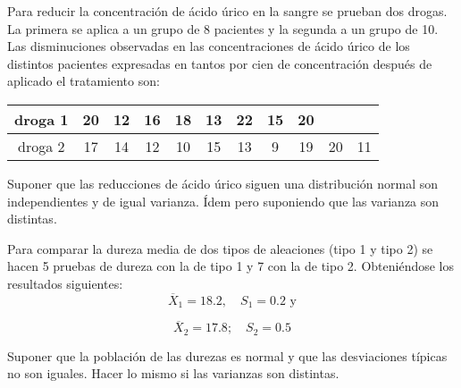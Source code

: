 \documentclass[12pt]{article}\usepackage[]{graphicx}\usepackage[]{color}
\begin{document}

\begin{prob}
Para reducir la concentración de ácido úrico en la sangre se prueban dos drogas. La primera
se aplica a un grupo de 8 pacientes y la segunda a un grupo de 10. Las disminuciones
observadas en las concentraciones de ácido úrico de los distintos pacientes expresadas en
tantos por cien de concentración después de aplicado el tratamiento son:

\begin{center}
\begin{tabular}{|c|c|c|c|c|c|c|c|c|c|c|}
droga 1 & 20 & 12 & 16 & 18 & 13 & 22 & 15 & 20\\ \hline droga 2 & 17 & 14 & 12 & 10 & 15 &
13 & 9 & 19 & 20 & 11
\end{tabular}
\end{center}

Suponer que las reducciones de ácido úrico siguen una
distribución normal son independientes y de igual varianza. 
Ídem pero suponiendo que las varianza son distintas.%
\end{prob}

\begin{prob}
Para comparar la dureza media de dos tipos de aleaciones (tipo 1 y tipo 2) se hacen 5
pruebas de dureza  con la de tipo 1 y 7 con la de tipo 2. Obteniéndose los resultados
siguientes:
$$\overline{X}_{1}=18.2,\quad S_{1}=0.2 \mbox{ y}$$

$$\overline{X}_{2}=17.8;\quad S_{2}=0.5$$

Suponer que la población de las durezas es normal y que las desviaciones típicas no son
iguales. Hacer lo mismo  si las varianzas son distintas.
\end{prob}
\newpage
\end{document}
